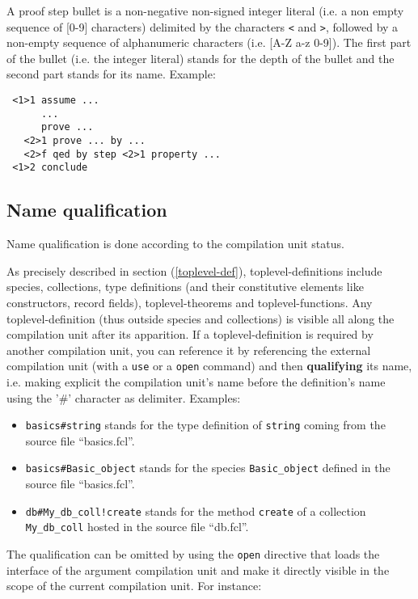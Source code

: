 {A proof step bullet is a non-negative non-signed integer literal
(i.e. a non empty sequence of [0-9] characters) delimited by the
characters {\tt <} and {\tt >}, followed by a non-empty sequence of
alphanumeric characters (i.e. [A-Z a-z 0-9]).
The first part of the bullet (i.e. the integer literal) stands for the
depth of the bullet and the second part stands for its name. Example:
{\scriptsize
\begin{lstlisting}
 <1>1 assume ...
      ...
      prove ...
   <2>1 prove ... by ...
   <2>f qed by step <2>1 property ...
 <1>2 conclude
\end{lstlisting}
}

\subsection{Name qualification}
\label{qualified-name}
 

Name qualification is done according to the
compilation unit status.

As precisely described in section (\ref{toplevel-def}),
toplevel-definitions include species, collections, type definitions
(and their constitutive elements like constructors, record fields),
toplevel-theorems and toplevel-functions.  Any toplevel-definition (thus
outside species and collections) is visible all along the compilation unit
after its apparition.
If a toplevel-definition is required by another compilation unit, you can
reference it by referencing the external compilation unit
(with a {\tt use} or a {\tt open} command) and then
{\bf qualifying} its name, i.e. making explicit the
compilation unit's name before the definition's name using the '\#'
character as delimiter. Examples:

\begin{itemize}
  \item {\tt basics\#string} stands for the type definition of
    {\tt string} coming from the source file ``basics.fcl''.
  \item {\tt  basics\#Basic\_object} stands for the species
    {\tt Basic\_object} defined in the source file ``basics.fcl''.
  \item {\tt db\#My\_db\_coll!create} stands for the method
    {\tt create} of a collection {\tt My\_db\_coll} hosted in the
    source file ``db.fcl''.
\end{itemize}

The qualification can be omitted by using the {\tt open} directive
that loads the interface of the argument compilation unit and make it
directly visible in the scope of the current compilation unit. For
instance:

}
